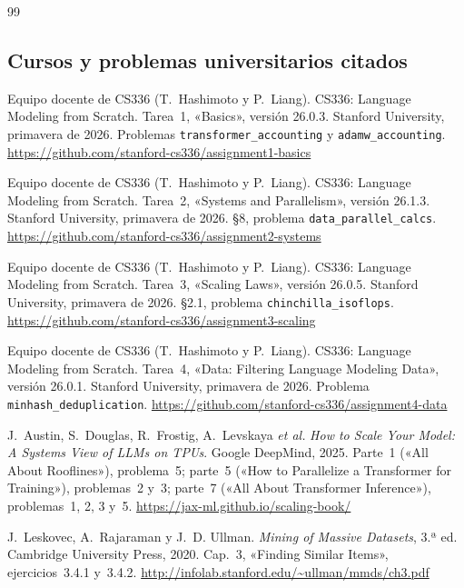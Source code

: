 \begin{thebibliography}{99}
\small

\subsection*{Cursos y problemas universitarios citados}

Equipo docente de CS336 (T.~Hashimoto y P.~Liang).
\newblock CS336: Language Modeling from Scratch. Tarea~1, «Basics», versión 26.0.3.
\newblock Stanford University, primavera de 2026. Problemas \texttt{transformer\_accounting} y \texttt{adamw\_accounting}.
\newblock \url{https://github.com/stanford-cs336/assignment1-basics}

Equipo docente de CS336 (T.~Hashimoto y P.~Liang).
\newblock CS336: Language Modeling from Scratch. Tarea~2, «Systems and Parallelism», versión 26.1.3.
\newblock Stanford University, primavera de 2026. §8, problema \texttt{data\_parallel\_calcs}.
\newblock \url{https://github.com/stanford-cs336/assignment2-systems}

Equipo docente de CS336 (T.~Hashimoto y P.~Liang).
\newblock CS336: Language Modeling from Scratch. Tarea~3, «Scaling Laws», versión 26.0.5.
\newblock Stanford University, primavera de 2026. §2.1, problema \texttt{chinchilla\_isoflops}.
\newblock \url{https://github.com/stanford-cs336/assignment3-scaling}

Equipo docente de CS336 (T.~Hashimoto y P.~Liang).
\newblock CS336: Language Modeling from Scratch. Tarea~4, «Data: Filtering Language Modeling Data», versión 26.0.1.
\newblock Stanford University, primavera de 2026. Problema \texttt{minhash\_deduplication}.
\newblock \url{https://github.com/stanford-cs336/assignment4-data}

J.~Austin, S.~Douglas, R.~Frostig, A.~Levskaya \emph{et al.}
\newblock \emph{How to Scale Your Model: A Systems View of LLMs on TPUs}.
\newblock Google DeepMind, 2025. Parte~1 («All About Rooflines»), problema~5; parte~5 («How to Parallelize a Transformer for Training»), problemas~2 y~3; parte~7 («All About Transformer Inference»), problemas~1, 2, 3 y~5.
\newblock \url{https://jax-ml.github.io/scaling-book/}

J.~Leskovec, A.~Rajaraman y J.~D. Ullman.
\newblock \emph{Mining of Massive Datasets}, 3.ª ed.
\newblock Cambridge University Press, 2020. Cap.~3, «Finding Similar Items», ejercicios~3.4.1 y~3.4.2.
\newblock \url{http://infolab.stanford.edu/~ullman/mmds/ch3.pdf}


\end{thebibliography}
